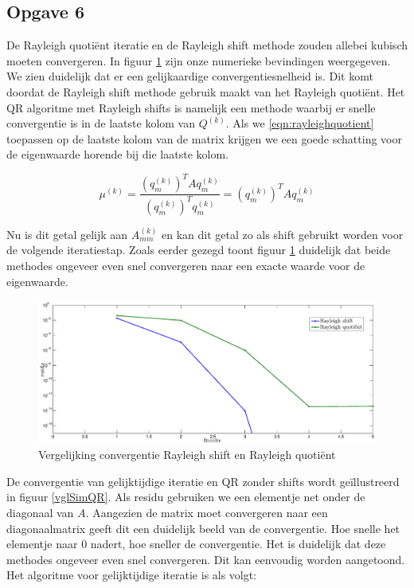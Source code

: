 \documentclass[a4paper, 12pt, titlepage]{report}
\begin{document}
\subsection{Opgave 6}
De Rayleigh quoti\"ent iteratie en de Rayleigh shift methode zouden allebei kubisch moeten convergeren. In figuur \ref{vglRayleigh} zijn onze numerieke bevindingen weergegeven. We zien duidelijk dat er een gelijkaardige convergentiesnelheid is. Dit komt doordat de Rayleigh shift methode gebruik maakt van het Rayleigh quoti\"ent. Het QR algoritme met Rayleigh shifts is namelijk een methode waarbij er snelle convergentie is in de laatste kolom van $Q^{(k)}$. Als we \eqref{eqn:rayleighquotient} toepassen op de laatste kolom van de matrix krijgen we een goede schatting voor de eigenwaarde horende bij die laatste kolom. 

\begin{equation}
	\mu^{(k)} = \frac{(q^{(k)}_m)^TAq^{(k)}_m}{(q^{(k)}_m)^Tq^{(k)}_m} = (q^{(k)}_m)^TAq^{(k)}_m
	\label{eqn:rayleighquotient}
\end{equation}

Nu is dit getal gelijk aan $A^{(k)}_{mm}$ en kan dit getal zo als shift gebruikt worden voor de volgende iteratiestap. Zoals eerder gezegd toont figuur \ref{vglRayleigh} duidelijk dat beide methodes ongeveer even snel convergeren naar een exacte waarde voor de eigenwaarde. \\

\begin{figure}[htb]
	\centering
	\includegraphics[width=\textwidth]{shiftvsquot.eps}
	\caption{Vergelijking convergentie Rayleigh shift en Rayleigh quoti\"ent}
	\label{vglRayleigh}
\end{figure}

De convergentie van gelijktijdige iteratie en QR zonder shifts wordt ge\"illustreerd in figuur \ref{vglSimQR}. Als residu gebruiken we een elementje net onder de diagonaal van $A$. Aangezien de matrix moet convergeren naar een diagonaalmatrix geeft dit een duidelijk beeld van de convergentie. Hoe snelle het elementje naar 0 nadert, hoe sneller de convergentie. Het is duidelijk dat deze methodes ongeveer even snel convergeren. Dit kan eenvoudig worden aangetoond. Het algoritme voor gelijktijdige iteratie is als volgt:
\end{document}
